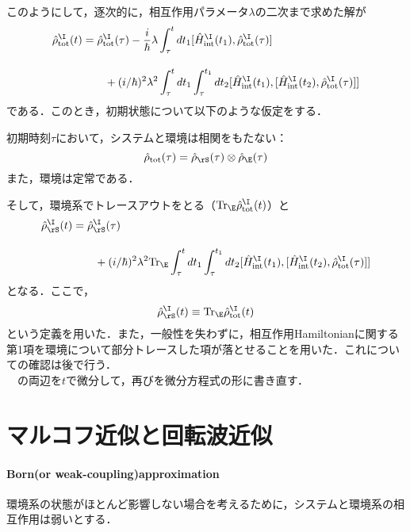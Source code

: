 このようにして，逐次的に，相互作用パラメータ$\lambda$の二次まで求めた解が
\begin{align}
    \hrho^{\I}_{\tot}(t)
    &=\hrho^{\I}_{\tot}(\tau)-\frac{i}{\hbar}\lambda
    \int_{\tau}^{t}dt_1[\hH^{\I}_{\rint}(t_1),\hrho^{\I}_{\tot}(\tau)]\nn[10pt]
    &\hspace{20pt}+({i}/{\hbar})^2\lambda^2\int_{\tau}^{t}dt_1\int_{\tau}^{t_1}dt_2[\hH^{\I}_{\rint}(t_1),
    [\hH^{\I}_{\rint}(t_2),\hrho^{\I}_{\tot}(\tau)]
    ]
\end{align}
である．このとき，初期状態について以下のような仮定をする．
\begin{kotak}
\begin{these}
    初期時刻$\tau$において，システムと環境は相関をもたない：
    \begin{equation}
        \hrho_{\tot}(\tau)=\hrho_{\rS}(\tau)\otimes\hrho_{\E}(\tau)
    \end{equation}
    また，環境は定常である．
\end{these}
\end{kotak}
そして，環境系でトレースアウトをとる（$\tr_{\E}\hrho^{\I}_{\tot}(t)$）と
\begin{align}
    \hrho^{\I}_{\rS}(t)
    &=\hrho^{\I}_{\rS}(\tau)\nn[10pt]
    &\hspace{20pt}+({i}/{\hbar})^2\lambda^2\tr_{\E}\int_{\tau}^{t}dt_1\int_{\tau}^{t_1}dt_2[\hH^{\I}_{\rint}(t_1),
    [\hH^{\I}_{\rint}(t_2),\hrho^{\I}_{\tot}(\tau)]
    ]
\end{align}
となる．ここで，
\begin{equation}
    \hrho^{\I}_{\rS}(t)\equiv\tr_{\E}\hrho^{\I}_{\tot}(t)
\end{equation}
という定義を用いた．また，一般性を失わずに，相互作用Hamiltonianに関する第1項を環境について部分トレースした項が落とせることを用いた．これについての確認は後で行う．\\
　の両辺を$t$で微分して，再びを微分方程式の形に書き直す．
\begin{equation}
    
\end{equation}





\section{マルコフ近似と回転波近似}
\paragraph{Born(or weak-coupling)approximation}
環境系の状態がほとんど影響しない場合を考えるために，システムと環境系の相互作用は弱いとする．

